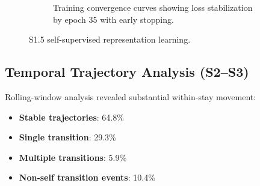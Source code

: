 \documentclass[11pt,a4paper]{article}
\begin{document}
\begin{figure}[htbp]
\begin{subfigure}[t]{0.28\textwidth}
\caption{Training convergence curves showing loss stabilization by epoch 35 with early stopping.}
\end{subfigure}
\caption{S1.5 self-supervised representation learning.}
\label{fig:s15}
\end{figure}

\FloatBarrier

\subsection{Temporal Trajectory Analysis (S2--S3)}

Rolling-window analysis revealed substantial within-stay movement:

\begin{itemize}[nosep]
  \item \textbf{Stable trajectories}: 64.8\%
  \item \textbf{Single transition}: 29.3\%
  \item \textbf{Multiple transitions}: 5.9\%
  \item \textbf{Non-self transition events}: 10.4\%
\end{itemize}
\end{document}
